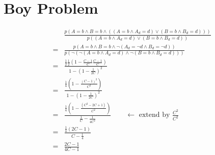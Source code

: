 \documentclass{article}
\begin{document}
\section{Boy Problem}
	\begin{align*}
		&\frac{p\left(A=b  \wedge B=b  \wedge \left(\left(A=b \wedge A_d = d\right)\vee \left(B=b \wedge B_d = d\right)\right)\right)}{p\left(\left(A=b \wedge A_d = d\right)\vee \left(B=b \wedge B_d = d\right)\right)}\\
		=&\frac{p\left(A=b  \wedge B=b  \wedge \neg\left(A_d =\neg d \wedge B_d = \neg d\right)\right)}{p\left(\neg \left(\neg\left(A=b \wedge A_d = d\right)\wedge \neg\left(B=b \wedge B_d = d\right)\right)\right)}\\
		=&\frac{\frac{1}{2}\frac{1}{2}\left(1-\frac{C-1}{C}\frac{C-1}{C}\right)}{1-\left(1-\frac{1}{2C}\right)^2}\\
		=&\frac{\frac{1}{4}\left(1-\frac{(C-1)^2}{C^2}\right)}{1-\left(1-\frac{1}{2C}\right)^2}\\
		=&\frac{\frac{1}{4}\left(1-\frac{(C^2-2C+1)}{C^2}\right)}{\frac{1}{C}-\frac{1}{4C^2}} \qquad \leftarrow\text{ extend by } \frac{C^2}{C^2} \\
		=&\frac{\frac{1}{4}(2C-1)}{C-\frac{1}{4}}\\
		=& \frac{2C-1}{4C-1}
	\end{align*}
\end{document}
